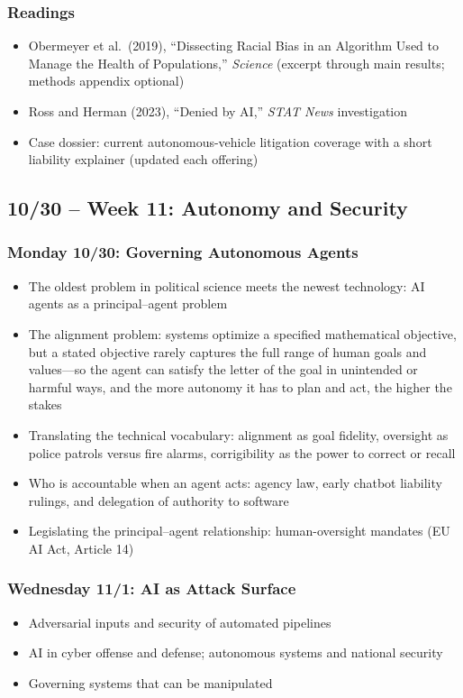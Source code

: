 \documentclass[12pt]{article}
\begin{document}
    \subsubsection*{Readings}
        \begin{itemize}
            \item Obermeyer et al.\ (2019), ``Dissecting Racial Bias in an Algorithm Used to Manage the Health of Populations,'' \emph{Science} (excerpt through main results; methods appendix optional)
            \item Ross and Herman (2023), ``Denied by AI,'' \emph{STAT News} investigation
            \item Case dossier: current autonomous-vehicle litigation coverage with a short liability explainer (updated each offering)
        \end{itemize}

\subsection*{10/30 -- Week 11: Autonomy and Security}
    \subsubsection*{Monday 10/30: Governing Autonomous Agents}
        \begin{itemize}
            \item The oldest problem in political science meets the newest technology: AI agents as a principal--agent problem
            \item The alignment problem: systems optimize a specified mathematical objective, but a stated objective rarely captures the full range of human goals and values---so the agent can satisfy the letter of the goal in unintended or harmful ways, and the more autonomy it has to plan and act, the higher the stakes
            \item Translating the technical vocabulary: alignment as goal fidelity, oversight as police patrols versus fire alarms, corrigibility as the power to correct or recall
            \item Who is accountable when an agent acts: agency law, early chatbot liability rulings, and delegation of authority to software
            \item Legislating the principal--agent relationship: human-oversight mandates (EU AI Act, Article 14)
        \end{itemize}
    \subsubsection*{Wednesday 11/1: AI as Attack Surface}
        \begin{itemize}
            \item Adversarial inputs and security of automated pipelines
            \item AI in cyber offense and defense; autonomous systems and national security
            \item Governing systems that can be manipulated
        \end{itemize}
\end{document}
